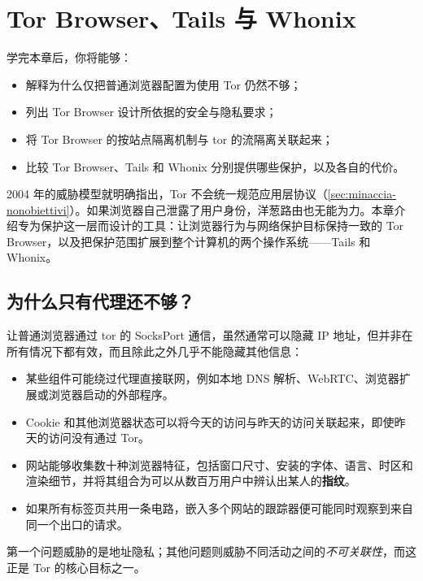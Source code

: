 \chapter{Tor Browser、Tails 与 Whonix}\label{cap:23-browser}

\begin{obiettivi}
学完本章后，你将能够：
\begin{itemize}[nosep]
  \item 解释为什么仅把普通浏览器配置为使用 Tor 仍然不够；
  \item 列出 Tor Browser 设计所依据的安全与隐私要求；
  \item 将 Tor Browser 的按站点隔离机制与 tor 的流隔离关联起来；
  \item 比较 Tor Browser、Tails 和 Whonix 分别提供哪些保护，以及各自的代价。
\end{itemize}
\end{obiettivi}

2004 年的威胁模型就明确指出，Tor 不会统一规范应用层协议（\cref{sec:minaccia-nonobiettivi}）。如果浏览器自己泄露了用户身份，洋葱路由也无能为力。本章介绍专为保护这一层而设计的工具：让浏览器行为与网络保护目标保持一致的 Tor Browser，以及把保护范围扩展到整个计算机的两个操作系统——Tails 和 Whonix。

\section{为什么只有代理还不够？}\label{sec:browser-proxy}

让普通浏览器通过 tor 的 SocksPort 通信，虽然通常可以隐藏 IP 地址，但并非在所有情况下都有效，而且除此之外几乎不能隐藏其他信息：
\begin{itemize}
  \item 某些组件可能绕过代理直接联网，例如本地 DNS 解析、WebRTC、浏览器扩展或浏览器启动的外部程序。
  \item Cookie 和其他浏览器状态可以将今天的访问与昨天的访问关联起来，即使昨天的访问没有通过 Tor。
  \item 网站能够收集数十种浏览器特征，包括窗口尺寸、安装的字体、语言、时区和渲染细节，并将其组合为可以从数百万用户中辨认出某人的\textbf{指纹}。
  \item 如果所有标签页共用一条电路，嵌入多个网站的跟踪器便可能同时观察到来自同一个出口的请求。
\end{itemize}
第一个问题威胁的是地址隐私；其他问题则威胁不同活动之间的\emph{不可关联性}，而这正是 Tor 的核心目标之一。

